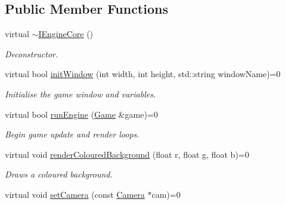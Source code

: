 \subsection*{Public Member Functions}
\begin{DoxyCompactItemize}
\item 
\mbox{\label{class_i_engine_core_a500720d444543140a1f4f1f80e03d87a}} 
virtual \mbox{\hyperlink{class_i_engine_core_a500720d444543140a1f4f1f80e03d87a}{$\sim$\+I\+Engine\+Core}} ()
\begin{DoxyCompactList}\small\item\em Deconstructor. \end{DoxyCompactList}\item 
\mbox{\label{class_i_engine_core_a27123704f8f24eefd9cb47aa9986cbf3}} 
virtual bool \mbox{\hyperlink{class_i_engine_core_a27123704f8f24eefd9cb47aa9986cbf3}{init\+Window}} (int width, int height, std\+::string window\+Name)=0
\begin{DoxyCompactList}\small\item\em Initialise the game window and variables. \end{DoxyCompactList}\item 
\mbox{\label{class_i_engine_core_ad03940f571ec20ba7427feeca44ace21}} 
virtual bool \mbox{\hyperlink{class_i_engine_core_ad03940f571ec20ba7427feeca44ace21}{run\+Engine}} (\mbox{\hyperlink{class_game}{Game}} \&game)=0
\begin{DoxyCompactList}\small\item\em Begin game update and render loops. \end{DoxyCompactList}\item 
\mbox{\label{class_i_engine_core_a8f8e0778f04c50b680cdde167cb38e2f}} 
virtual void \mbox{\hyperlink{class_i_engine_core_a8f8e0778f04c50b680cdde167cb38e2f}{render\+Coloured\+Background}} (float r, float g, float b)=0
\begin{DoxyCompactList}\small\item\em Draws a coloured background. \end{DoxyCompactList}\item 
\mbox{\label{class_i_engine_core_ab2f643ce25708c87b20eecdcbb18b9ac}} 
virtual void \mbox{\hyperlink{class_i_engine_core_ab2f643ce25708c87b20eecdcbb18b9ac}{set\+Camera}} (const \mbox{\hyperlink{class_camera}{Camera}} $\ast$cam)=0

\end{DoxyCompactItemize}
